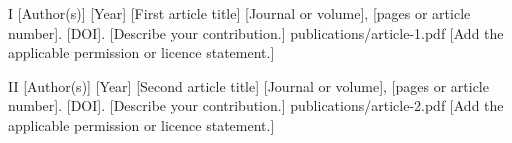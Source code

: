 \thesisarticle
  {I}
  {[Author(s)]}
  {[Year]}
  {[First article title]}
  {[Journal or volume], [pages or article number]. [DOI].}
  {[Describe your contribution.]}
  {publications/article-1.pdf}
  {[Add the applicable permission or licence statement.]}

\thesisarticle
  {II}
  {[Author(s)]}
  {[Year]}
  {[Second article title]}
  {[Journal or volume], [pages or article number]. [DOI].}
  {[Describe your contribution.]}
  {publications/article-2.pdf}
  {[Add the applicable permission or licence statement.]}
